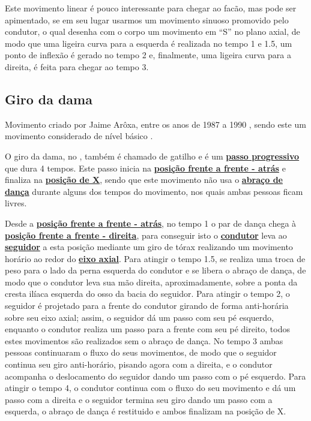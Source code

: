 Este movimento linear é pouco interessante para chegar ao facão, mas pode ser apimentado,
se em seu lugar usarmos um movimento sinuoso promovido pelo condutor, 
o qual desenha com o corpo um movimento em ``S'' no plano axial, 
de modo que uma ligeira curva para a esquerda é realizada no tempo 1 e 1.5,
um ponto de inflexão é gerado no tempo 2 e, 
finalmente, uma ligeira curva para a direita, é feita para chegar ao tempo 3. 


\subsection{Giro da dama}

Movimento criado por Jaime Arôxa, entre os anos de 1987 a 1990 \cite{EntrevistaJaimeAroxa1},
sendo este um movimento considerado de nível básico \cite[pp. 144]{perna2002samba}.

O giro da dama, no \AnoLivro, também é chamado de gatilho e 
é um \hyperref[def:PassoDeDeslocamento]{\textbf{passo progressivo}} que dura 4 tempos.
Este passo inicia na \hyperref[def:ffa-position]{\textbf{posição frente a frente - atrás}} e 
finaliza na \hyperref[def:X-position]{\textbf{posição de X}},
sendo que este movimento não usa o \hyperref[def:abracodedanca]{\textbf{abraço de dança}} 
durante alguns dos tempos do movimento,
nos quais ambas pessoas ficam livres.

Desde a \hyperref[def:ffa-position]{\textbf{posição frente a frente - atrás}},
no tempo 1 o par de dança chega à \hyperref[def:ffd-position]{\textbf{posição frente a frente - direita}},
para conseguir isto o \hyperref[def:Condutor]{\textbf{condutor}} 
leva ao \hyperref[def:Seguidor]{\textbf{seguidor}} a esta posição 
mediante um giro de tórax realizando um movimento horário 
ao redor do \hyperref[def:EixoAxial]{\textbf{eixo axial}}.
Para atingir o tempo 1.5, se realiza uma troca de peso para o lado da perna esquerda do condutor
e se libera o abraço de dança, de modo que o condutor leva sua mão direita, aproximadamente,
sobre a ponta da cresta ilíaca esquerda do osso da bacia do seguidor.
Para atingir o tempo 2, o seguidor é projetado para a frente do condutor 
girando de forma anti-horária sobre seu eixo axial; assim, o seguidor dá um passo 
com seu pé esquerdo, enquanto o condutor realiza um passo para a frente com seu pé direito,
todos estes movimentos são realizados sem o abraço de dança.
No tempo 3 ambas pessoas continuaram o fluxo do seus movimentos,
de modo que o seguidor continua seu giro anti-horário, pisando agora com a direita,
e o condutor acompanha o deslocamento do seguidor dando um passo com o pé esquerdo.
Para atingir o tempo 4, o condutor continua com o fluxo do seu movimento e dá 
um passo com a direita e o seguidor termina seu giro dando um passo com a esquerda,
o abraço de dança é restituido e ambos finalizam na posição de X.

